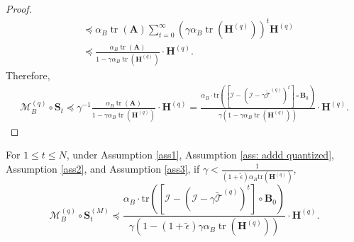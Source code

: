 \documentclass[11pt, letterpaper]{article}
\begin{document}
\begin{proof}
\begin{equation*}
\begin{aligned}
            &\preceq\alpha_B\operatorname{tr}(\mathbf{A})\sum_{t=0}^{\infty}(\gamma\alpha_B\operatorname{tr}(\mathbf{H}^{(q)}))^t\mathbf{H}^{(q)}\\
            &\preceq\frac{\alpha_B\operatorname{tr}(\mathbf{A})}{1-\gamma\alpha_B\operatorname{tr}(\mathbf{H}^{(q)})}\cdot\mathbf{H}^{(q)}.
        \end{aligned}
    \end{equation*}
    Therefore,
    \begin{equation*}
        \begin{aligned}
            \mathcal{M}_B^{(q)} \circ \mathbf{S}_t \preceq \gamma^{-1}\frac{\alpha_B\operatorname{tr}(\mathbf{A})}{1-\gamma\alpha_B\operatorname{tr}(\mathbf{H}^{(q)})}\cdot\mathbf{H}^{(q)}=\frac{\alpha_B\cdot\mathrm{tr}\left(\left[\mathcal{I}-(\mathcal{I}-\gamma\widetilde{\mathcal{T}}^{(q)})^t\right]\circ\mathbf{B}_0\right)}{\gamma(1-\gamma\alpha_B\operatorname{tr}(\mathbf{H}^{(q)}))}\cdot\mathbf{H}^{(q)}.
        \end{aligned}
    \end{equation*}
\end{proof}

\begin{lemma}
    \label{A bound for M_B^{(q)} S_t^{(M)}}
    For $1 \leq t\leq N$, under Assumption \ref{ass1}, Assumption \ref{ass: addd quantized}, Assumption \ref{ass2}, and Assumption \ref{ass3}, if $\gamma < \frac{1}{(1+\tilde{\epsilon})\alpha_B\mathrm{tr}(\mathbf{H}^{(q)})}$,
    \begin{equation*}
         \mathcal{M}_B^{(q)} \circ \mathbf{S}_t^{(M)} \preceq \frac{\alpha_B\cdot\mathrm{tr}\left(\left[\mathcal{I}-(\mathcal{I}-\gamma\widetilde{\mathcal{T}}^{(q)})^t\right]\circ\mathbf{B}_0\right)}{\gamma(1-(1+\tilde{\epsilon})\gamma\alpha_B\operatorname{tr}(\mathbf{H}^{(q)}))}\cdot\mathbf{H}^{(q)}.
    \end{equation*}
\end{lemma}
\end{document}

